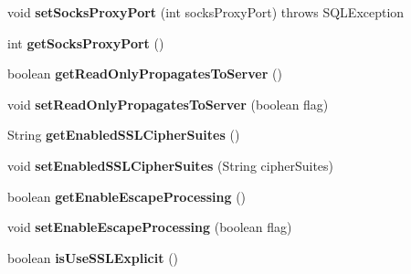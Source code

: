 \begin{DoxyCompactItemize}
$$void {\bfseries set\+Socks\+Proxy\+Port} (int socks\+Proxy\+Port)  throws S\+Q\+L\+Exception 
\item 
\mbox{\label{classcom_1_1mysql_1_1jdbc_1_1_multi_host_my_s_q_l_connection_af880f81a7456fbc6c80bf04957bc9c4c}} 
int {\bfseries get\+Socks\+Proxy\+Port} ()
\item 
\mbox{\label{classcom_1_1mysql_1_1jdbc_1_1_multi_host_my_s_q_l_connection_aa3be4658edfc9f18cc6d983bd39b1fa3}} 
boolean {\bfseries get\+Read\+Only\+Propagates\+To\+Server} ()
\item 
\mbox{\label{classcom_1_1mysql_1_1jdbc_1_1_multi_host_my_s_q_l_connection_a331b5f4981fe2d46b96243f623d09e67}} 
void {\bfseries set\+Read\+Only\+Propagates\+To\+Server} (boolean flag)
\item 
\mbox{\label{classcom_1_1mysql_1_1jdbc_1_1_multi_host_my_s_q_l_connection_acb1f279648aec1a660be4874cd22978c}} 
String {\bfseries get\+Enabled\+S\+S\+L\+Cipher\+Suites} ()
\item 
\mbox{\label{classcom_1_1mysql_1_1jdbc_1_1_multi_host_my_s_q_l_connection_a8a955708f111cae10279429cd124e93c}} 
void {\bfseries set\+Enabled\+S\+S\+L\+Cipher\+Suites} (String cipher\+Suites)
\item 
\mbox{\label{classcom_1_1mysql_1_1jdbc_1_1_multi_host_my_s_q_l_connection_a375dc1e05ec3ac5dca876a4653d0256c}} 
boolean {\bfseries get\+Enable\+Escape\+Processing} ()
\item 
\mbox{\label{classcom_1_1mysql_1_1jdbc_1_1_multi_host_my_s_q_l_connection_a442ecf7ab0a57ea97e49972e7f0cc449}} 
void {\bfseries set\+Enable\+Escape\+Processing} (boolean flag)
\item 
\mbox{\label{classcom_1_1mysql_1_1jdbc_1_1_multi_host_my_s_q_l_connection_a5d64af0081aff5eb912fec3fa6daf521}} 
boolean {\bfseries is\+Use\+S\+S\+L\+Explicit} ()
\end{DoxyCompactItemize}
